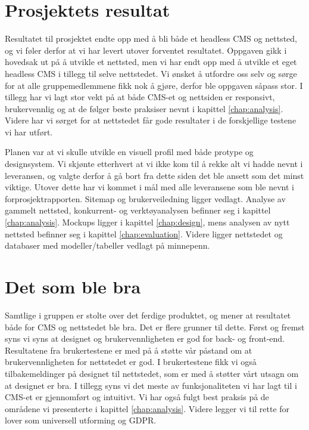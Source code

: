 \section{Prosjektets resultat}
Resultatet til prosjektet endte opp med å bli både et headless CMS og nettsted, og vi føler derfor at vi har levert utover forventet resultatet. Oppgaven gikk i hovedsak ut på å utvikle et nettsted, men vi har endt opp med å utvikle et eget headless CMS i tillegg til selve nettstedet. Vi ønsket å utfordre oss selv og sørge for at alle gruppemedlemmene fikk nok å gjøre, derfor ble oppgaven såpass stor. I tillegg har vi lagt stor vekt på at både CMS-et og nettsiden er responsivt, brukervennlig og at de følger beste praksiser nevnt i kapittel \ref{chap:analysis}. Videre har vi sørget for at nettstedet får gode resultater i de forskjellige testene vi har utført.

Planen var at vi skulle utvikle en visuell profil med både protype og designsystem. Vi skjønte etterhvert at vi ikke kom til å rekke alt vi hadde nevnt i leveransen, og valgte derfor å gå bort fra dette siden det ble ansett som det minst viktige. Utover dette har vi kommet i mål med alle leveransene som ble nevnt i forprosjektrapporten. Sitemap og brukerveiledning ligger vedlagt. Analyse av gammelt nettsted, konkurrent- og verktøyanalysen befinner seg i kapittel \ref{chap:analysis}. Mockups ligger i kapittel \ref{chap:design}, mens analysen av nytt nettsted befinner seg i kapittel \ref{chap:evaluation}. Videre ligger nettstedet og databaser med modeller/tabeller vedlagt på minnepenn.

\section{Det som ble bra}
Samtlige i gruppen er stolte over det ferdige produktet, og mener at resultatet både for CMS og nettstedet ble bra. Det er flere grunner til dette. Først og fremst syns vi syns at designet og brukervennligheten er god for back- og front-end. Resultatene fra brukertestene er med på å støtte vår påstand om at brukervennligheten for nettstedet er god. I brukertestene fikk vi også tilbakemeldinger på designet til nettstedet, som er med å støtter vårt utsagn om at designet er bra. I tillegg syns vi det meste av funksjonaliteten vi har lagt til i CMS-et er gjennomført og intuitivt. Vi har også fulgt best praksis på de områdene vi presenterte i kapittel \ref{chap:analysis}. Videre legger vi til rette for lover som universell utforming og GDPR. 

